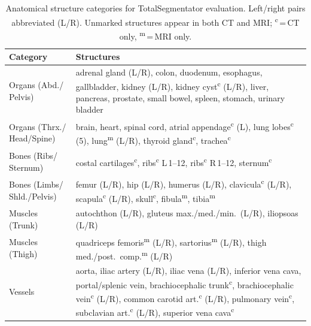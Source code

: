 \documentclass[10pt,twocolumn,letterpaper]{article}
\begin{document}
\begin{table}[t]
\centering
\caption{Anatomical structure categories for TotalSegmentator
evaluation. Left/right pairs abbreviated (L/R).
Unmarked structures appear in both CT and MRI;
\textsuperscript{c}\,=\,CT only,
\textsuperscript{m}\,=\,MRI only.}
\label{tab:category_definitions}
\small
\setlength{\tabcolsep}{4pt}
\begin{tabular}{@{}p{1.8cm} p{5.4cm}@{}}
\toprule
\textbf{Category} & \textbf{Structures} \\
\midrule
Organs (Abd./ Pelvis)
& adrenal gland (L/R), colon, duodenum, esophagus,
  gallbladder, kidney (L/R),
  kidney cyst\textsuperscript{c} (L/R),
  liver, pancreas, prostate, small bowel, spleen,
  stomach, urinary bladder \\
\addlinespace[3pt]
Organs (Thrx./ Head/Spine)
& brain, heart, spinal cord,
  atrial appendage\textsuperscript{c} (L),
  lung lobes\textsuperscript{c} (5),
  lung\textsuperscript{m} (L/R),
  thyroid gland\textsuperscript{c},
  trachea\textsuperscript{c} \\
\addlinespace[3pt]
Bones (Ribs/ Sternum)
& costal cartilages\textsuperscript{c},
  ribs\textsuperscript{c} L\,1--12,
  ribs\textsuperscript{c} R\,1--12,
  sternum\textsuperscript{c} \\
\addlinespace[3pt]
Bones (Limbs/ Shld./Pelvis)
& femur (L/R), hip (L/R), humerus (L/R),
  clavicula\textsuperscript{c} (L/R),
  scapula\textsuperscript{c} (L/R),
  skull\textsuperscript{c},
  fibula\textsuperscript{m},
  tibia\textsuperscript{m} \\
\addlinespace[3pt]
Muscles (Trunk)
& autochthon (L/R),
  gluteus max./med./min.\ (L/R),
  iliopsoas (L/R) \\
\addlinespace[3pt]
Muscles (Thigh)
& quadriceps femoris\textsuperscript{m} (L/R),
  sartorius\textsuperscript{m} (L/R),
  thigh med./post.\ comp.\textsuperscript{m} (L/R) \\
\addlinespace[3pt]
Vessels
& aorta, iliac artery (L/R), iliac vena (L/R),
  inferior vena cava, portal/splenic vein,
  brachiocephalic trunk\textsuperscript{c},
  brachiocephalic vein\textsuperscript{c} (L/R),
  common carotid art.\textsuperscript{c} (L/R),
  pulmonary vein\textsuperscript{c},
  subclavian art.\textsuperscript{c} (L/R),
  superior vena cava\textsuperscript{c} \\
\bottomrule
\end{tabular}
\end{table}
\end{document}
